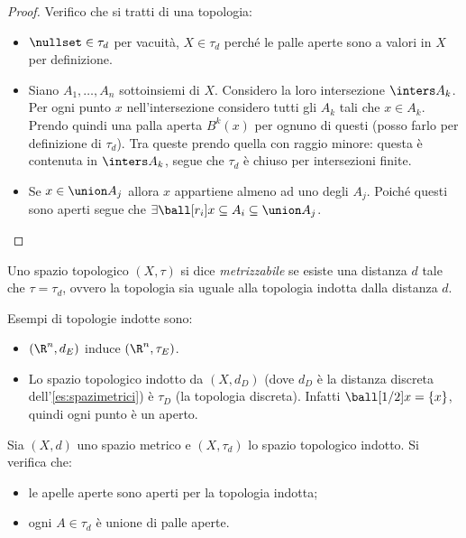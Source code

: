 \begin{proof}
	Verifico che si tratti di una topologia:
	\begin{itemize}
		\item
			$\nullset \in \tau_d$ per vacuità,
			$X \in \tau_d$ perché le palle aperte sono a valori in $X$ per definizione.
		\item
			Siano $A_1,\ldots,A_n$ sottoinsiemi di $X$.
			Considero la loro intersezione $\inters A_k$.
			Per ogni punto $x$ nell'intersezione considero tutti gli $A_k$ tali che $x \in A_k$.
			Prendo quindi una palla aperta $B^k(x)$ per ognuno di questi (posso farlo per definizione di $\tau_d$).
			Tra queste prendo quella con raggio minore: questa è contenuta in $\inters A_k$,
			segue che $\tau_d$ è chiuso per intersezioni finite.
		\item
			Se $x \in \union A_j$ allora $x$ appartiene almeno ad uno degli $A_j$.
			Poiché questi sono aperti segue che
			$\exists \ball[r_i]x \subseteq A_i \subseteq \union A_j$. \qedhere
	\end{itemize}
\end{proof}

\begin{defn}
	Uno spazio topologico $(X,\tau)$ si dice \emph{metrizzabile} se esiste una distanza $d$ tale che $\tau=\tau_d$,
	ovvero la topologia sia uguale alla topologia indotta dalla distanza $d$.
\end{defn}

\begin{es}
	Esempi di topologie indotte sono:
	\begin{itemize}
		\item $(\R^n,d_E)$  induce $(\R^n,\tau_E)$.
		\item Lo spazio topologico indotto da $(X,d_D)$ (dove $d_D$ è la distanza discreta dell'\autoref{es:spazimetrici}) è $\tau_D$ (la topologia discreta).
		Infatti $\ball[1/2]x = \{x\}$, quindi ogni punto è un aperto.
	\end{itemize}
\end{es}

\begin{prop}
	Sia $(X,d)$ uno spazio metrico e $(X,\tau_d)$ lo spazio topologico indotto.
	Si verifica che:
	\begin{itemize}
		\item le apelle aperte sono aperti per la topologia indotta;
		\item ogni $A \in \tau_d$ è unione di palle aperte.
	\end{itemize}
\end{prop}

